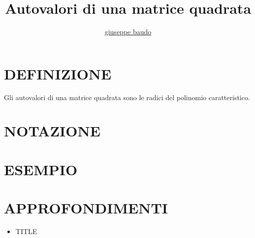 \documentclass[a4paper,10pt]{article}
\title{Autovalori di una matrice quadrata}
\author{\href{http://www.baudo.hol.es}{giuseppe baudo}}
\begin{document}
\maketitle

\section{DEFINIZIONE}
Gli autovalori di una matrice quadrata sono le radici del polinomio caratteristico.

\section{NOTAZIONE}

\section{ESEMPIO}

\section{APPROFONDIMENTI}
\begin{itemize}
 \item TITLE
\end{itemize}
\end{document}
